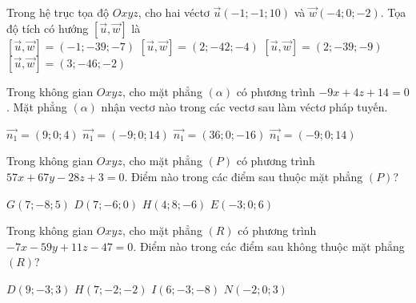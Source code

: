 \documentclass[12pt,a4paper]{article}
\begin{document}
\begin{ex}
 Trong hệ trục tọa độ ${Oxyz}$, cho hai véctơ $\overrightarrow{u}(-1;-1;10)$ và $\overrightarrow{w}(-4;0;-2)$. Tọa độ tích có hướng $\left[\overrightarrow{u},\overrightarrow{w}\right]$ là\\ 
\choice
{ $\left[\overrightarrow{u},\overrightarrow{w}\right]=(-1;-39;-7)$ }
   { \True $\left[\overrightarrow{u},\overrightarrow{w}\right]= (2;-42;-4)$ }
     { $\left[\overrightarrow{u},\overrightarrow{w}\right]=(2;-39;-9)$ }
    { $\left[\overrightarrow{u},\overrightarrow{w}\right]=(3;-46;-2)$ }
\end{ex}

\begin{ex}
 Trong không gian ${Oxyz}$, cho mặt phẳng ${(\alpha)}$ có phương trình $- 9 x + 4 z + 14=0$. Mặt phẳng ${(\alpha)}$ nhận vectơ nào trong các vectơ sau làm véctơ pháp tuyến.
 
\choice
{ $\overrightarrow{n_1}=(9;0;4)$ }
   { $\overrightarrow{n_1}=(-9;0;14)$ }
     { \True $\overrightarrow{n_1}=(36;0;-16)$ }
    { $\overrightarrow{n_1}=(-9;0;14)$ }
\end{ex}

\begin{ex}
 Trong không gian ${Oxyz}$, cho mặt phẳng ${(P)}$ có phương trình $57 x + 67 y - 28 z + 3=0$. Điểm nào trong các điểm sau thuộc mặt phẳng ${(P)}$?
 
\choice
{ $G(7;-8;5)$ }
   { \True $D(7;-6;0)$ }
     { $H(4;8;-6)$ }
    { $E(-3;0;6)$ }
\end{ex}

\begin{ex}
 Trong không gian ${Oxyz}$, cho mặt phẳng ${(R)}$ có phương trình $- 7 x - 59 y + 11 z - 47=0$. Điểm nào trong các điểm sau không thuộc mặt phẳng ${(R)}$?
 
\choice
{ \True $D(9;-3;3)$ }
   { $H(7;-2;-2)$ }
     { $I(6;-3;-8)$ }
    { $N(-2;0;3)$ }
\end{ex}
\end{document}
